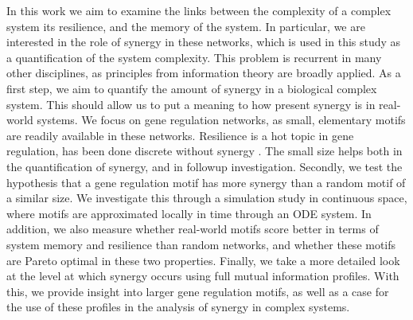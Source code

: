 \documentclass[../main.tex]{subfiles}
\begin{document}
In this work we aim to examine the links between the complexity of a complex system its resilience, and the memory of the system.
In particular, we are interested in the role of synergy in these networks, which is used in this study as a quantification of the system complexity.
This problem is recurrent in many other disciplines, as principles from information theory are broadly applied.
As a first step, we aim to quantify the amount of synergy in a biological complex system.
This should allow us to put a meaning to how present synergy is in real-world systems.
We focus on gene regulation networks, as small, elementary motifs are readily available in these networks.
Resilience is a hot topic in gene regulation, has been done discrete without synergy \cite{peixoto2012emergence}.
The small size helps both in the quantification of synergy, and in followup investigation.
Secondly, we test the hypothesis that a gene regulation motif has more synergy than a random motif of a similar size. 
We investigate this through a simulation study in continuous space, where motifs are approximated locally in time through an ODE system.
In addition, we also measure whether real-world motifs score better in terms of system memory and resilience than random networks, and whether these motifs are Pareto optimal in these two properties.
Finally, we take a more detailed look at the level at which synergy occurs using full mutual information profiles.
With this, we provide insight into larger gene regulation motifs, as well as a case for the use of these profiles in the analysis of synergy in complex systems.
\end{document}
